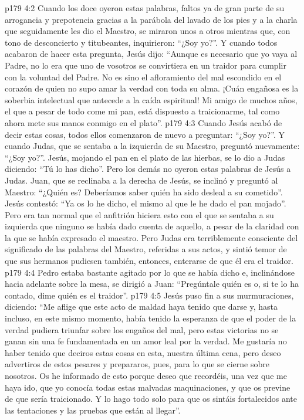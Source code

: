 \vs p179 4:2 Cuando los doce oyeron estas palabras, faltos ya de gran parte de su arrogancia y prepotencia gracias a la parábola del lavado de los pies y a la charla que seguidamente les dio el Maestro, se miraron unos a otros mientras que, con tono de desconcierto y titubeantes, inquirieron: “¿Soy yo?”. Y cuando todos acabaron de hacer esta pregunta, Jesús dijo: “Aunque es necesario que yo vaya al Padre, no lo era que uno de vosotros se convirtiera en un traidor para cumplir con la voluntad del Padre. No es sino el afloramiento del mal escondido en el corazón de quien no supo amar la verdad con toda su alma. ¡Cuán engañosa es la soberbia intelectual que antecede a la caída espiritual! Mi amigo de muchos años, el que a pesar de todo come mi pan, está dispuesto a traicionarme, tal como ahora mete sus manos conmigo en el plato”.
\vs p179 4:3 Cuando Jesús acabó de decir estas cosas, todos ellos comenzaron de nuevo a preguntar: “¿Soy yo?”. Y cuando Judas, que se sentaba a la izquierda de su Maestro, preguntó nuevamente: “¿Soy yo?”. Jesús, mojando el pan en el plato de las hierbas, se lo dio a Judas diciendo: “Tú lo has dicho”. Pero los demás no oyeron estas palabras de Jesús a Judas. Juan, que se reclinaba a la derecha de Jesús, se inclinó y preguntó al Maestro: “¿Quién es? Deberíamos saber quién ha sido desleal a su cometido”. Jesús contestó: “Ya os lo he dicho, el mismo al que le he dado el pan mojado”. Pero era tan normal que el anfitrión hiciera esto con el que se sentaba a su izquierda que ninguno se había dado cuenta de aquello, a pesar de la claridad con la que se había expresado el maestro. Pero Judas era terriblemente consciente del significado de las palabras del Maestro, referidas a sus actos, y sintió temor de que sus hermanos pudiesen también, entonces, enterarse de que él era el traidor.
\vs p179 4:4 Pedro estaba bastante agitado por lo que se había dicho e, inclinándose hacia adelante sobre la mesa, se dirigió a Juan: “Pregúntale quién es o, si te lo ha contado, dime quién es el traidor”.
\vs p179 4:5 Jesús puso fin a sus murmuraciones, diciendo: “Me aflige que este acto de maldad haya tenido que darse y, hasta incluso, en este mismo momento, había tenido la esperanza de que el poder de la verdad pudiera triunfar sobre los engaños del mal, pero estas victorias no se ganan sin una fe fundamentada en un amor leal por la verdad. Me gustaría no haber tenido que deciros estas cosas en esta, nuestra última cena, pero deseo advertiros de estos pesares y prepararos, pues, para lo que se cierne sobre nosotros. Os he informado de esto porque deseo que recordéis, una vez que me haya ido, que yo conocía todas estas malvadas maquinaciones, y que os previne de que sería traicionado. Y lo hago todo solo para que os sintáis fortalecidos ante las tentaciones y las pruebas que están al llegar”.
